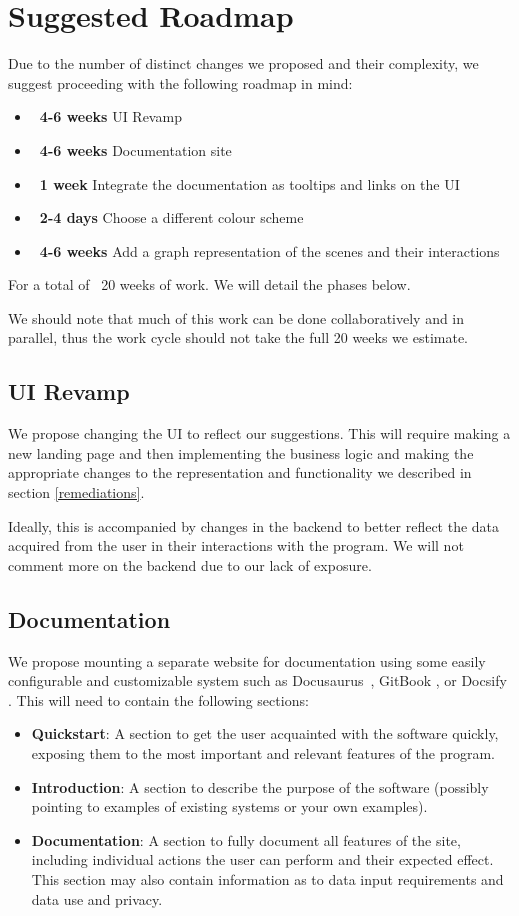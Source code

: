 \documentclass[sigart]{acmart_mod} %
\begin{document}
\section{Suggested Roadmap}
Due to the number of distinct changes we proposed and their complexity, we suggest proceeding with the following roadmap in mind:
\begin{itemize}
  \item \textbf{~4-6 weeks} UI Revamp
  \item \textbf{~4-6 weeks} Documentation site
  \item \textbf{~1 week} Integrate the documentation as tooltips and links on the UI
  \item \textbf{~2-4 days} Choose a different colour scheme
  \item \textbf{~4-6 weeks} Add a graph representation of the scenes and their interactions
\end{itemize}
For a total of ~20 weeks of work. We will detail the phases below.

We should note that much of this work can be done collaboratively and in parallel, thus the work cycle should not take the full 20 weeks we estimate.

\subsection{UI Revamp}
We propose changing the UI to reflect our suggestions. This will require making a new landing page and then implementing the business logic and making the appropriate changes to the representation and functionality we described in section \ref{remediations}.

Ideally, this is accompanied by changes in the backend to better reflect the data acquired from the user in their interactions with the program. We will not comment more on the backend due to our lack of exposure.

\subsection{Documentation}
We propose mounting a separate website for documentation using some easily configurable and customizable system such as Docusaurus~\cite{FacebookDocusaurus2024}, GitBook \cite{GitBookKnowledgeManagement}, or Docsify \cite{DocsifyjsDocsifyMagical}. This will need to contain the following sections:
\begin{itemize}
  \item \textbf{Quickstart}: A section to get the user acquainted with the software quickly, exposing them to the most important and relevant features of the program.
  \item \textbf{Introduction}: A section to describe the purpose of the software (possibly pointing to examples of existing systems or your own examples).
  \item \textbf{Documentation}: A section to fully document all features of the site, including individual actions the user can perform and their expected effect. This section may also contain information as to data input requirements and data use and privacy.
\end{itemize}
\end{document}
